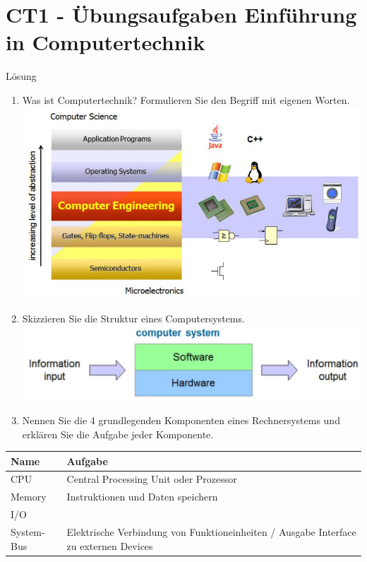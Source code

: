\documentclass[10pt]{article}
\begin{document}
\section*{CT1 - Übungsaufgaben Einführung in Computertechnik}
Lösung

\begin{enumerate}
  \item Was ist Computertechnik? Formulieren Sie den Begriff mit eigenen Worten.\\
\includegraphics[max width=\textwidth, center]{2025_01_02_f240dc33b50f25226887g-1(1)}
  \item Skizzieren Sie die Struktur eines Computersystems.\\
\includegraphics[max width=\textwidth, center]{2025_01_02_f240dc33b50f25226887g-1}
  \item Nennen Sie die 4 grundlegenden Komponenten eines Rechnersystems und erklären Sie die Aufgabe jeder Komponente.
\end{enumerate}

\begin{center}
\begin{tabular}{|l|l|}
\hline
Name & Aufgabe \\
\hline
CPU & Central Processing Unit oder Prozessor \\
\hline
Memory & Instruktionen und Daten speichern \\
\hline
I/O &  \\
\hline
System-Bus & Elektrische Verbindung von Funktioneinheiten / Ausgabe Interface zu externen Devices \\
\hline
\end{tabular}
\end{center}
\end{document}
